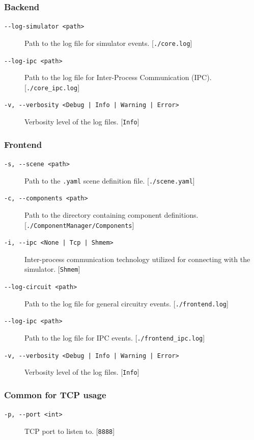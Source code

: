 \subsubsection{Backend}
\begin{description}
    \item[\texttt{-{}-log-simulator <path>}] Path to the log file for simulator events. [\texttt{./core.log}]
    \item[\texttt{-{}-log-ipc <path>}] Path to the log file for Inter-Process Communication (IPC). [\texttt{./core\_ipc.log}]
    \item[\texttt{-v, -{}-verbosity <Debug | Info | Warning | Error>}] Verbosity level of the log files. [\texttt{Info}]
\end{description}

\subsubsection{Frontend}
\begin{description}
    \item[\texttt{-s, -{}-scene <path>}] Path to the \texttt{.yaml} scene definition file. [\texttt{./scene.yaml}]
    \item[\texttt{-c, -{}-components <path>}] Path to the directory containing component definitions. [\texttt{./ComponentManager/Components}]
    \item[\texttt{-i, -{}-ipc <None | Tcp | Shmem>}] Inter-process communication technology utilized for connecting with the simulator. [\texttt{Shmem}]
    \item[\texttt{-{}-log-circuit <path>}] Path to the log file for general circuitry events. [\texttt{./frontend.log}]
    \item[\texttt{-{}-log-ipc <path>}] Path to the log file for IPC events. [\texttt{./frontend\_ipc.log}]
    \item[\texttt{-v, -{}-verbosity <Debug | Info | Warning | Error>}] Verbosity level of the log files. [\texttt{Info}]
\end{description}

\subsubsection{Common for TCP usage}
\begin{description}
    \item[\texttt{-p, -{}-port <int>}] TCP port to listen to. [\texttt{8888}]
\end{description}

